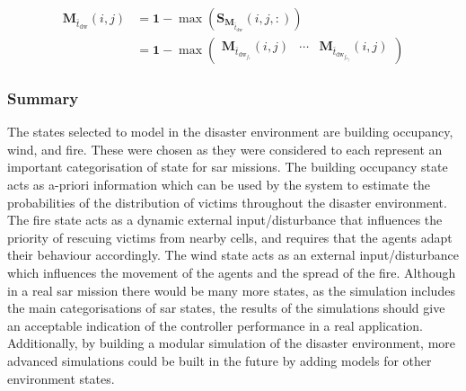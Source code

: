 \documentclass[conference]{IEEEtran}
\begin{document}
\begin{equation}
    \begin{split}
        \bm{M}_{\bar{t}_{\text{dw}}}(i,j) &= \bm{1} - \max (\bm{S}_{\bm{M}_{\bar{t}_{\text{dw}}}} (i,j, :)) \\
        &=  \bm{1} - \max
        \begin{pmatrix}
            \bm{M}_{\bar{t}_{\text{dw}_{f_{1}}}}(i,j) & \cdots & \bm{M}_{\bar{t}_{\text{dw}_{f_{n_{f}}}}}(i,j)
        \end{pmatrix}
    \end{split}
\end{equation}

\subsubsection{Summary}

The states selected to model in the disaster environment are building occupancy, wind, and fire.
These were chosen as they were considered to each represent an important categorisation of state for \gls{sar} missions.
The building occupancy state acts as a-priori information which can be used by the system to estimate the probabilities of the distribution of victims throughout the disaster environment.
The fire state acts as a dynamic external input/disturbance that influences the priority of rescuing victims from nearby cells, and requires that the agents adapt their behaviour accordingly.
The wind state acts as an external input/disturbance which influences the movement of the agents and the spread of the fire.
Although in a real \gls{sar} mission there would be many more states, as the simulation includes the main categorisations of \gls{sar} states, the results of the simulations should give an acceptable indication of the controller performance in a real application.
Additionally, by building a modular simulation of the disaster environment, more advanced simulations could be built in the future by adding models for other environment states.
\end{document}

